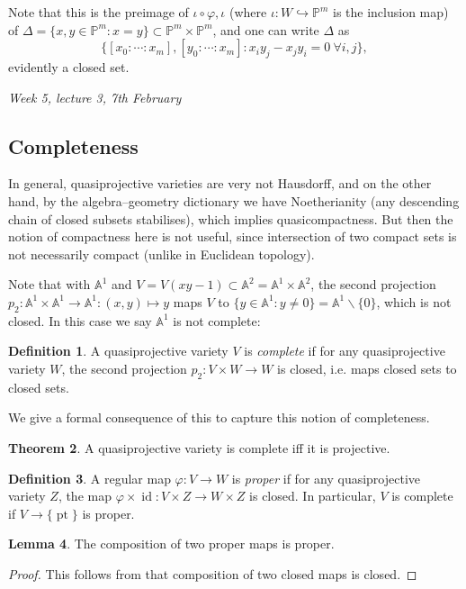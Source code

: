 \documentclass{article}
\newcommand{\A}{\mathbb{A}}
\newcommand{\p}{\mathbb{P}}
\newcommand{\id}{\operatorname{id}}
\theoremstyle{definition}
\newtheorem{defn}{Definition}[subsection]
\newtheorem{thm}[defn]{Theorem}
\newtheorem{lemma}[defn]{Lemma}
\begin{document}
Note that this is the preimage of $\iota\circ\varphi,\iota$ (where $\iota:W\hookrightarrow\p^m$ is the inclusion map) of $\Delta=\{x,y\in\p^m:x=y\}\subset\p^m\times\p^m$, and one can write $\Delta$ as
\[
\{[x_0:\cdots:x_m],[y_0:\cdots:x_m]:x_iy_j-x_jy_i=0 \ \forall i,j\},
\]
evidently a closed set.

\begin{flushright}
\textit{Week 5, lecture 3, 7th February}
\end{flushright}

\subsection{Completeness}
In general, quasiprojective varieties are very not Hausdorff, and on the other hand, by the algebra--geometry dictionary we have Noetherianity (any descending chain of closed subsets stabilises), which implies quasicompactness. But then the notion of compactness here is not useful, since intersection of two compact sets is not necessarily compact (unlike in Euclidean topology).

Note that with $\A^1$ and $V=V(xy-1)\subset\A^2=\A^1\times\A^2$, the second projection $p_2:\A^1\times\A^1\rightarrow\A^1:(x,y)\mapsto y$ maps $V$ to $\{y\in \A^1:y\neq 0\}=\A^1\backslash\{0\}$, which is not closed. In this case we say $\A^1$ is not complete:

\begin{defn}
A quasiprojective variety $V$ is \textit{complete} if for any quasiprojective variety $W$, the second projection $p_2:V\times W\rightarrow W$ is closed, i.e. maps closed sets to closed sets.
\end{defn}

We give a formal consequence of this to capture this notion of completeness.

\begin{thm}
\label{thm:completeisprojective}
A quasiprojective variety is complete iff it is projective.
\end{thm}

\begin{defn}
A regular map $\varphi:V\rightarrow W$ is \textit{proper} if for any quasiprojective variety $Z$, the map $\varphi\times\id:V\times Z\rightarrow W\times Z$ is closed. In particular, $V$ is complete if $V\rightarrow\{\operatorname{pt}\}$ is proper.
\end{defn}

\begin{lemma}
\label{lemma:compofpropisprop}
The composition of two proper maps is proper.
\end{lemma}
\begin{proof}
This follows from that composition of two closed maps is closed.
\end{proof}
\end{document}
